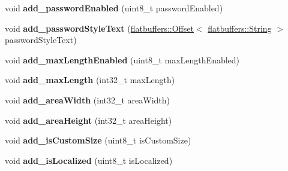 \begin{DoxyCompactItemize}
\item 
\mbox{\label{structflatbuffers_1_1TextFieldOptionsBuilder_a13907e604f0f127d5d8901b1319954e4}} 
void {\bfseries add\+\_\+password\+Enabled} (uint8\+\_\+t password\+Enabled)
\item 
\mbox{\label{structflatbuffers_1_1TextFieldOptionsBuilder_a52069341029d30072999492aebca31ce}} 
void {\bfseries add\+\_\+password\+Style\+Text} (\hyperlink{structflatbuffers_1_1Offset}{flatbuffers\+::\+Offset}$<$ \hyperlink{structflatbuffers_1_1String}{flatbuffers\+::\+String} $>$ password\+Style\+Text)
\item 
\mbox{\label{structflatbuffers_1_1TextFieldOptionsBuilder_a0a8a77a341679f7dce836d0d8ee3c4c5}} 
void {\bfseries add\+\_\+max\+Length\+Enabled} (uint8\+\_\+t max\+Length\+Enabled)
\item 
\mbox{\label{structflatbuffers_1_1TextFieldOptionsBuilder_a06c1461d501f3fd691ff0a7d14d6945d}} 
void {\bfseries add\+\_\+max\+Length} (int32\+\_\+t max\+Length)
\item 
\mbox{\label{structflatbuffers_1_1TextFieldOptionsBuilder_a5c9e9f345da5a3f51070950652c421a7}} 
void {\bfseries add\+\_\+area\+Width} (int32\+\_\+t area\+Width)
\item 
\mbox{\label{structflatbuffers_1_1TextFieldOptionsBuilder_a6fe49680ffc16d086a014b2a84e83b91}} 
void {\bfseries add\+\_\+area\+Height} (int32\+\_\+t area\+Height)
\item 
\mbox{\label{structflatbuffers_1_1TextFieldOptionsBuilder_a6a4822c4c3b717346be2b60e5a54571b}} 
void {\bfseries add\+\_\+is\+Custom\+Size} (uint8\+\_\+t is\+Custom\+Size)
\item 
\mbox{\label{structflatbuffers_1_1TextFieldOptionsBuilder_a1313dd54b657c3f63de4e7f2f1ac9a38}} 
void {\bfseries add\+\_\+is\+Localized} (uint8\+\_\+t is\+Localized)
\item 

\end{DoxyCompactItemize}
